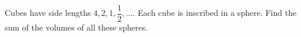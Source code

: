 Cubes have side lengths $4,2,1,\dfrac{1}{2},\ldots$. Each cube is inscribed in a sphere. Find the sum of the volumes of all these spheres.

